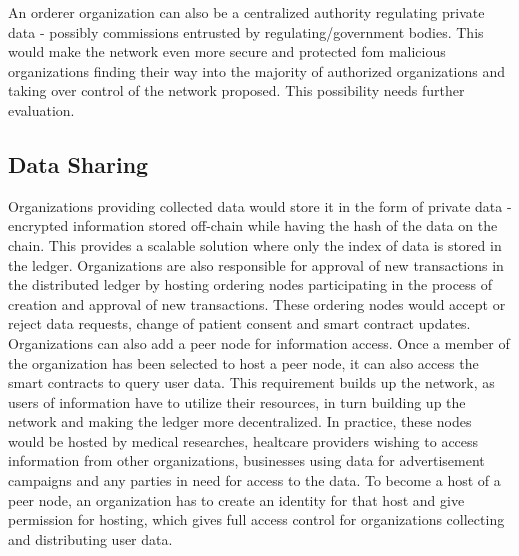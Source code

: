 \documentclass[12pt]{article}
\begin{document}
        An orderer organization can also be a centralized authority regulating private data - possibly commissions entrusted by regulating/government bodies. This would make the network even more secure and protected fom malicious organizations finding their way into the majority of authorized organizations and taking over control of the network proposed. This possibility needs further evaluation.

        \subsection{Data Sharing}
        Organizations providing collected data would store it in the form of private data - encrypted information stored off-chain while having the hash of the data on the chain. This provides a scalable solution where only the index of data is stored in the ledger. Organizations are also responsible for approval of new transactions in the distributed ledger by hosting ordering nodes participating in the process of creation and approval of new transactions. These ordering nodes would accept or reject data requests, change of patient consent and smart contract updates. Organizations can also add a peer node for information access. Once a member of the organization has been selected to host a peer node, it can also access the smart contracts to query user data. This requirement builds up the network, as users of information have to utilize their resources, in turn building up the network and making the ledger more decentralized. In practice, these nodes would be hosted by medical researches, healtcare providers wishing to access information from other organizations, businesses using data for advertisement campaigns and any parties in need for access to the data. To become a host of a peer node, an organization has to create an identity for that host and give permission for hosting, which gives full access control for organizations collecting and distributing user data.
\end{document}
